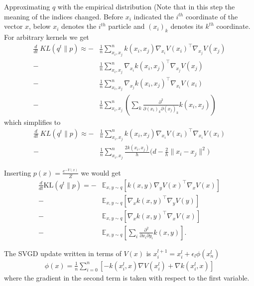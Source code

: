 \documentclass{article}
\begin{document}
    Approximating $q$ with the empirical distribution
    (Note that in this step the meaning of the indices changed. Before $x_i$ indicated the $i^{th}$
    coordinate of the vector $x$, below $x_i$ denotes the $i^{th}$ particle and $(x_i)_k$ denotes
    its $k^{th}$ coordinate.
    For arbitrary kernels we get
    \begin{align}
        \frac{d}{dt}\ KL( q^t \| p ) \approx -& \frac{1}{n}\sum_{x_i,x_j}^n  k(x_i,x_j) \nabla_{x_i} V(x_i)^\top \nabla_{x_j} V(x_j)  \\ 
        -& \frac{1}{n}\sum_{x_i,x_j}^n  \nabla_{x_i} k(x_i,x_j)^\top \nabla_{x_j} V(x_j)  \\ 
        -& \frac{1}{n}\sum_{x_i,x_j}^n  \nabla_{x_j} k(x_i,x_j)^\top \nabla_{x_i} V(x_i)  \\ 
        -& \frac{1}{n}\sum_{x_i,x_j}^n \left( \sum_k \frac{ \partial^2 }{ \partial (x_i)_k \partial (x_j)_k } 
            k(x_i,x_j) \right)
    \end{align}
    which simplifies to 
    \begin{align}
        \frac{d}{dt}\ KL( q^t \| p ) \approx -& \frac{1}{n}\sum_{x_i,x_j}^n  k(x_i,x_j) \nabla_{x_i} V(x_i)^\top \nabla_{x_i} V(x_i)  \\ 
        -& \frac{1}{n}\sum_{x_i,x_j}^n \frac{2k(x_i, x_j)}{h}\Big( d - \frac{2}{h} \|x_i - x_j\|^2 \Big)
    \end{align} 

    Inserting $p(x) = \frac{e^{-V(x)}}{Z}$ we would get
    \begin{align}
        \frac{d}{dt} \text{KL}( q^t \| p ) =
        -& \mathbb{E}_{x,y\sim q} \left[ k(x,y) \nabla_y V(x)^\top \nabla_x V(x) \right] \\ 
        -& \mathbb{E}_{x,y\sim q} \left[ \nabla_x k(x,y)^\top \nabla_y V(y) \right] \\ 
        -& \mathbb{E}_{x,y\sim q} \left[ \nabla_x k(x,y)^\top \nabla_x V(x) \right] \\ 
        -& \mathbb{E}_{x,y\sim q} \left[ \sum_i \frac{ \partial^2 }{ \partial x_i \partial y_i } k(x,y) \right]
        .
    \end{align}

    The SVGD update written in terms of $V(x)$ is $x_i^{l+1} = x_i^l + \epsilon_l \phi(x_n^l)$
    \begin{align}
        \phi(x) = \frac{1}{n} \sum_{i=0}^{n} \left[
            - k(x_i^l, x) \nabla V(x_i^l) + \nabla k(x_i^l, x)
        \right]
    \end{align}
    where the gradient in the second term is taken with respect to the first variable.
    
\end{document}
